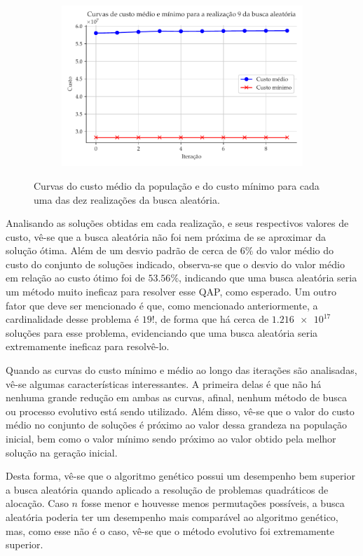 \documentclass[a4paper, 12pt]{article}
\begin{document}
\begin{figure}[!ht]
\begin{subfigure}{0.4\textwidth}
\end{subfigure}
\begin{subfigure}{0.4\textwidth}
    \includegraphics[width=\textwidth]{figuras/iteracao-9.pdf}
\end{subfigure}
\hfill
\caption{Curvas do custo médio da população e do custo mínimo para cada uma das dez realizações da busca aleatória.}
\label{fig:curvas-busca-aleatoria}
\end{figure}

Analisando as soluções obtidas em cada realização, e seus respectivos valores de custo, vê-se que a busca aleatória não foi nem próxima de se aproximar da solução ótima. Além de um desvio padrão de cerca de $6\%$ do valor médio do custo do conjunto de soluções indicado, observa-se que o desvio do valor médio em relação ao custo ótimo foi de $53.56\%$, indicando que uma busca aleatória seria um método muito ineficaz para resolver esse QAP, como esperado. Um outro fator que deve ser mencionado é que, como mencionado anteriormente, a cardinalidade desse problema é $19!$, de forma que há cerca de $\num{1.216e17}$ soluções para esse problema, evidenciando que uma busca aleatória seria extremamente ineficaz para resolvê-lo.

Quando as curvas do custo mínimo e médio ao longo das iterações são analisadas, vê-se algumas características interessantes. A primeira delas é que não há nenhuma grande redução em ambas as curvas, afinal, nenhum método de busca ou processo evolutivo está sendo utilizado. Além disso, vê-se que o valor do custo médio no conjunto de soluções é próximo ao valor dessa grandeza na população inicial, bem como o valor mínimo sendo próximo ao valor obtido pela melhor solução na geração inicial. 

Desta forma, vê-se que o algoritmo genético possui um desempenho bem superior a busca aleatória quando aplicado a resolução de problemas quadráticos de alocação. Caso $n$ fosse menor e houvesse menos permutações possíveis, a busca aleatória poderia ter um desempenho mais comparável ao algoritmo genético, mas, como esse não é o caso, vê-se que o método evolutivo foi extremamente superior.

\clearpage





 
\end{document}
